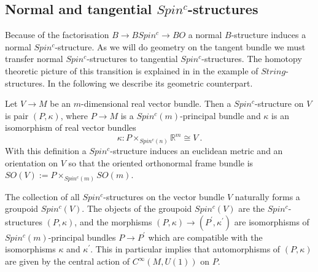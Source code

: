 \documentclass[12pt]{article}
\newcommand{\R}{{\mathbb{R}}}
\begin{document}
%
\subsection{Normal and tangential $Spin^{c}$-structures}\label{sec1677}

Because of the factorisation $B\to BSpin^{c}\to BO$ 
a normal $B$-structure induces a normal $Spin^{c}$-structure. As we will do geometry on the tangent bundle we must transfer normal $Spin^{c}$-structures to tangential $Spin^{c}$-structures. The homotopy theoretic picture of this transition is explained  in \cite[Sec. 8]{2009arXiv0912.4875B} in the example of $String$-structures. In the following we describe its geometric counterpart.

Let $V\to M$ be an $m$-dimensional real vector bundle. Then a  $Spin^{c}$-structure on $V$ is pair $(P,\kappa)$, where
$P\to M$ is a $Spin^{c}(m)$-principal bundle and $\kappa$ is an isomorphism of real vector bundles
$$\kappa:P\times_{Spin^{c}(n)}\R^{m}\cong V\ .$$
With this definition a $Spin^{c}$-structure induces an euclidean metric and an orientation on $V$ so that the oriented orthonormal frame bundle is $SO(V):=P\times_{Spin^{c}(m)} SO(m)$.




The collection  of all $Spin^{c}$-structures on the vector bundle  $V$  naturally forms a groupoid 
 $Spin^{c}(V)$. 
The objects of the groupoid  $Spin^{c}(V)$ are the $Spin^{c}$-structures $(P,\kappa)$, and the morphisms
$(P,\kappa)\to (P^{\prime},\kappa^{\prime})$
are isomorphisms of $Spin^{c}(m)$-principal bundles $P\to P^{\prime}$ which are compatible with the isomorphisms $\kappa$ and $\kappa^{\prime}$. This in particular implies that automorphisms of $(P,\kappa)$  are given by the central action of $C^{\infty}(M,U(1))$ on $P$.
\end{document}
